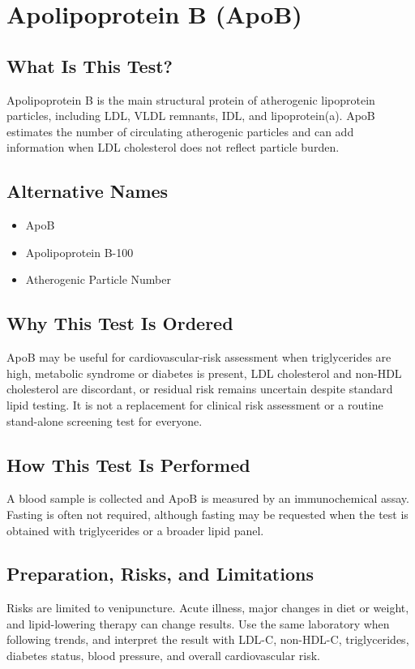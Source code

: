 \chapter{Apolipoprotein B (ApoB)}

\section*{What Is This Test?}
Apolipoprotein B is the main structural protein of atherogenic lipoprotein particles, including LDL, VLDL remnants, IDL, and lipoprotein(a). ApoB estimates the number of circulating atherogenic particles and can add information when LDL cholesterol does not reflect particle burden.

\section*{Alternative Names}
\begin{itemize}
  \item ApoB
  \item Apolipoprotein B-100
  \item Atherogenic Particle Number
\end{itemize}
\section*{Why This Test Is Ordered}
ApoB may be useful for cardiovascular-risk assessment when triglycerides are high, metabolic syndrome or diabetes is present, LDL cholesterol and non-HDL cholesterol are discordant, or residual risk remains uncertain despite standard lipid testing. It is not a replacement for clinical risk assessment or a routine stand-alone screening test for everyone.

\section*{How This Test Is Performed}
A blood sample is collected and ApoB is measured by an immunochemical assay. Fasting is often not required, although fasting may be requested when the test is obtained with triglycerides or a broader lipid panel.

\section*{Preparation, Risks, and Limitations}
Risks are limited to venipuncture. Acute illness, major changes in diet or weight, and lipid-lowering therapy can change results. Use the same laboratory when following trends, and interpret the result with LDL-C, non-HDL-C, triglycerides, diabetes status, blood pressure, and overall cardiovascular risk.

